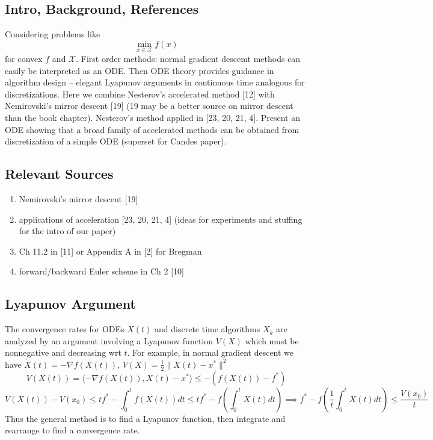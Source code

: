 

\subsection{Intro, Background, References}
Considering problems like
\[ \min_{x\in\mathcal{X}} f(x) \]
for convex $f$ and $\mathcal{X}$. First order methods: normal gradient descemt methods can easily be interpreted as an ODE. Then ODE theory provides guidance in algorithm design -- elegant Lyapunov arguments in continuous time analogous for discretizations. Here we combine Nesterov's accelerated method [12] with Nemirovski's mirror descent [19] (19 may be a better source on mirror descent than the book chapter). Nesterov's method applied in [23, 20, 21, 4]. Present an ODE showing that a broad family of accelerated methods can be obtained from discretization of a simple ODE (superset for Candes paper).

\subsection{Relevant Sources}
\begin{enumerate}
    \item Nemirovski's mirror descent [19]
    \item applications of acceleration [23, 20, 21, 4] (ideas for experiments and stuffing for the intro of our paper)
    \item Ch 11.2 in [11] or Appendix A in [2] for Bregman
    \item forward/backward Euler scheme in Ch 2 [10]
\end{enumerate}

\subsection{Lyapunov Argument}
The convergence rates for ODEs $X(t)$ and discrete time algorithms $X_k$ are analyzed by an argument involving a Lyapunov function $V(X)$ which must be nonnegative and decreasing wrt $t$. For example, in normal gradient descent we have $\dot X(t) = -\nabla f(X(t))$, $V(
X) = \frac{1}{2}\|X(t)-x^*\|^2$
\[\dot V(X(t)) = \langle  -\nabla f(X(t)), X(t) - x^*\rangle \leq -(f(X(t)) - f^*)\]
\[ V(X(t)) - V(x_0) \leq tf^* - \int_0^t f(X(t))dt \leq tf^* - f\left(\int_0^t X(t)dt\right) \implies  f^* - f\left(\frac{1}{t}\int_0^t X(t)dt\right) \leq \frac{V(x_0)}{t} \]
Thus the general method is to find a Lyapunov function, then integrate and rearrange to find a convergence rate.

